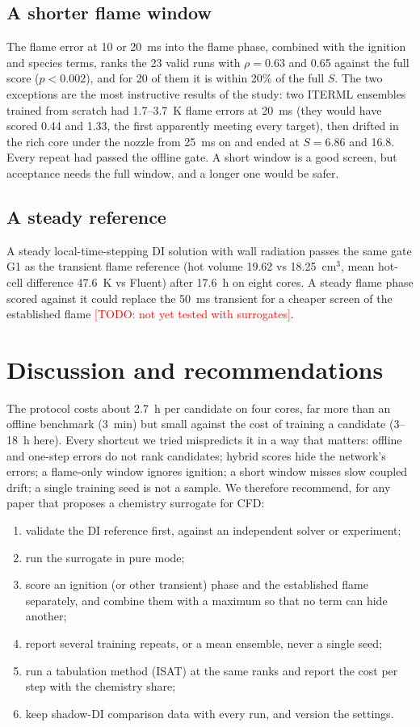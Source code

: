 \documentclass[preprint,review,12pt]{elsarticle}
\newcommand{\todo}[1]{\textcolor{red}{[TODO: #1]}}
\begin{document}
\subsection{A shorter flame window}
The flame error at 10 or 20~ms into the flame phase, combined with the ignition and species terms, ranks the 23 valid
runs with $\rho=0.63$ and 0.65 against the full score ($p<0.002$), and for 20 of them it is within 20\% of the full
$S$. The two exceptions are the most instructive results of the study: two ITERML ensembles trained from scratch had
1.7--3.7~K flame errors at 20~ms (they would have scored 0.44 and 1.33, the first apparently meeting every target),
then drifted in the rich core under the nozzle from 25~ms on and ended at $S=6.86$ and 16.8. Every repeat had passed
the offline gate. A short window is a good screen, but acceptance needs the full window, and a longer one would be
safer.

\subsection{A steady reference}
A steady local-time-stepping DI solution with wall radiation passes the same gate G1 as the transient flame reference
(hot volume 19.62 vs 18.25~cm$^3$, mean hot-cell difference 47.6~K vs Fluent) after 17.6~h on eight cores. A steady
flame phase scored against it could replace the 50~ms transient for a cheaper screen of the established flame
\todo{not yet tested with surrogates}.

\section{Discussion and recommendations}
\label{sec:discussion}
The protocol costs about 2.7~h per candidate on four cores, far more than an offline benchmark (3~min) but small
against the cost of training a candidate (3--18~h here). Every shortcut we tried mispredicts it in a way that matters:
offline and one-step errors do not rank candidates; hybrid scores hide the network's errors; a flame-only window
ignores ignition; a short window misses slow coupled drift; a single training seed is not a sample. We therefore
recommend, for any paper that proposes a chemistry surrogate for CFD:
\begin{enumerate}
\item validate the DI reference first, against an independent solver or experiment;
\item run the surrogate in pure mode;
\item score an ignition (or other transient) phase and the established flame separately, and combine them with a
  maximum so that no term can hide another;
\item report several training repeats, or a mean ensemble, never a single seed;
\item run a tabulation method (ISAT) at the same ranks and report the cost per step with the chemistry share;
\item keep shadow-DI comparison data with every run, and version the settings.
\end{enumerate}
\end{document}
